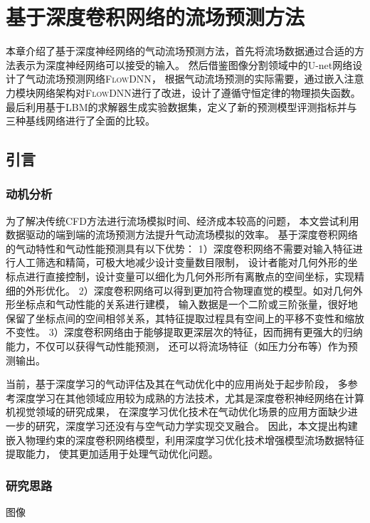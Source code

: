 \chapter{基于深度卷积网络的流场预测方法}

本章介绍了基于深度神经网络的气动流场预测方法，首先将流场数据通过合适的方法表示为深度神经网络可以接受的输入。
然后借鉴图像分割领域中的U-net网络设计了气动流场预测网络\textsc{FlowDNN}，
根据气动流场预测的实际需要，通过嵌入注意力模块网络架构对\textsc{FlowDNN}进行了改进，设计了遵循守恒定律的物理损失函数。
最后利用基于LBM的求解器生成实验数据集，定义了新的预测模型评测指标并与三种基线网络进行了全面的比较。


\section{引言}

\subsection{动机分析}

为了解决传统CFD方法进行流场模拟时间、经济成本较高的问题，
本文尝试利用数据驱动的端到端的流场预测方法提升气动流场模拟的效率。
基于深度卷积网络的气动特性和气动性能预测具有以下优势：
1）深度卷积网络不需要对输入特征进行人工筛选和精简，可极大地减少设计变量数目限制，
设计者能对几何外形的坐标点进行直接控制，设计变量可以细化为几何外形所有离散点的空间坐标，实现精细的外形优化。
2）深度卷积网络可以得到更加符合物理直觉的模型。如对几何外形坐标点和气动性能的关系进行建模，
输入数据是一个二阶或三阶张量，很好地保留了坐标点间的空间相邻关系，其特征提取过程具有空间上的平移不变性和缩放不变性。
3）深度卷积网络由于能够提取更深层次的特征，因而拥有更强大的归纳能力，不仅可以获得气动性能预测，
还可以将流场特征（如压力分布等）作为预测输出。

当前，基于深度学习的气动评估及其在气动优化中的应用尚处于起步阶段，
多参考深度学习在其他领域应用较为成熟的方法技术，尤其是深度卷积神经网络在计算机视觉领域的研究成果，
在深度学习优化技术在气动优化场景的应用方面缺少进一步的研究，深度学习还没有与空气动力学实现交叉融合。
因此，本文提出构建嵌入物理约束的深度卷积网络模型，利用深度学习优化技术增强模型流场数据特征提取能力，
使其更加适用于处理气动优化问题。


\subsection{研究思路}

图像

